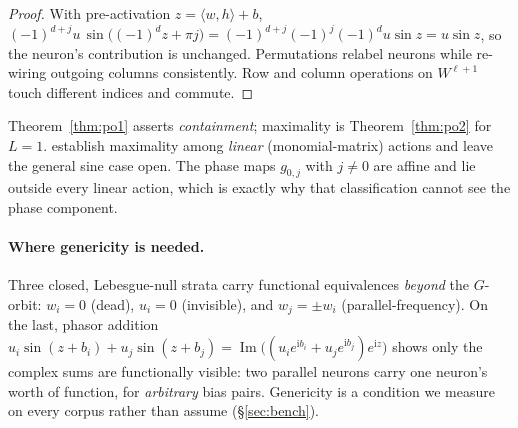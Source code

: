 \begin{proof}
With pre-activation $z = \langle w,h\rangle + b$,
$(-1)^{d+j} u\,\sin\!\big((-1)^d z + \pi j\big)
 = (-1)^{d+j}(-1)^{j}(-1)^{d} u \sin z = u \sin z$,
so the neuron's contribution is unchanged. Permutations relabel neurons while re-wiring outgoing
columns consistently. Row and column operations on $W^{\ell+1}$ touch different indices and
commute.
\end{proof}

\begin{remark}\label{rem:affine}
Theorem~\ref{thm:po1} asserts \emph{containment}; maximality is Theorem~\ref{thm:po2} for $L=1$.
\citet{tran2024monomial} establish maximality among \emph{linear} (monomial-matrix) actions and
leave the general sine case open. The phase maps $g_{0,j}$ with $j\neq0$ are affine and lie outside
every linear action, which is exactly why that classification cannot see the phase component.
\end{remark}

\paragraph{Where genericity is needed.} Three closed, Lebesgue-null strata carry functional
equivalences \emph{beyond} the $G$-orbit: $w_i = 0$ (dead), $u_i = 0$ (invisible), and
$w_j = \pm w_i$ (parallel-frequency). On the last, phasor addition
$u_i\sin(z+b_i) + u_j\sin(z+b_j) = \operatorname{Im}\big((u_ie^{\mathrm i b_i}
+ u_je^{\mathrm i b_j})e^{\mathrm i z}\big)$
shows only the complex sums are functionally visible: two parallel neurons carry one neuron's worth
of function, for \emph{arbitrary} bias pairs. Genericity is a condition we measure on every corpus
rather than assume (\S\ref{sec:bench}).

